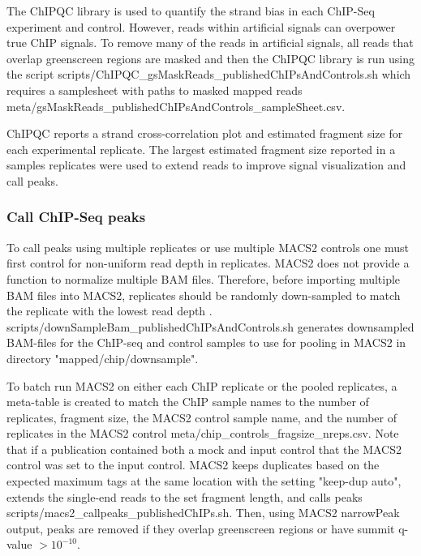 \documentclass{article}
\begin{document}
\begin{sloppypar}
The ChIPQC library is used to quantify the strand bias in each ChIP-Seq experiment and control. However, reads within artificial signals can overpower true ChIP signals. To remove many of the reads in artificial signals, all reads that overlap greenscreen regions are masked and then the ChIPQC library is run using the script {\selectfont scripts/ChIPQC\_gsMaskReads\_publishedChIPsAndControls.sh} which requires a samplesheet with paths to masked mapped reads {\selectfont meta/gsMaskReads\_publishedChIPsAndControls\_sampleSheet.csv}.

ChIPQC reports a strand cross-correlation plot and estimated fragment size for each experimental replicate. The largest estimated fragment size reported in a samples replicates were used to extend reads to improve signal visualization and call peaks.

\subsubsection{Call ChIP-Seq peaks}

To call peaks using multiple replicates or use multiple MACS2 controls one must first control for non-uniform read depth in replicates. MACS2 does not provide a function to normalize multiple BAM files. Therefore, before importing multiple BAM files into MACS2, replicates should be randomly down-sampled to match the replicate with the lowest read depth \cite{downsamp}. {\selectfont scripts/downSampleBam\_publishedChIPsAndControls.sh} generates downsampled BAM-files for the ChIP-seq and control samples to use for pooling in MACS2  in directory "mapped/chip/downsample".

To batch run MACS2 on either each ChIP replicate or the pooled replicates, a meta-table is created to match the ChIP sample names to the number of replicates, fragment size, the MACS2 control sample name, and the number of replicates in the MACS2 control {\selectfont meta/chip\_controls\_fragsize\_nreps.csv}. Note that if a publication contained both a mock and input control that the MACS2 control was set to the input control. MACS2 keeps duplicates based on the expected maximum tags at the same location with the setting "keep-dup auto", extends the single-end reads to the set fragment length, and calls peaks {\selectfont scripts/macs2\_callpeaks\_publishedChIPs.sh}. Then, using MACS2 narrowPeak output, peaks are removed if they overlap greenscreen regions or have summit q-value $>10^{-10}$.



\end{sloppypar}
\end{document}
